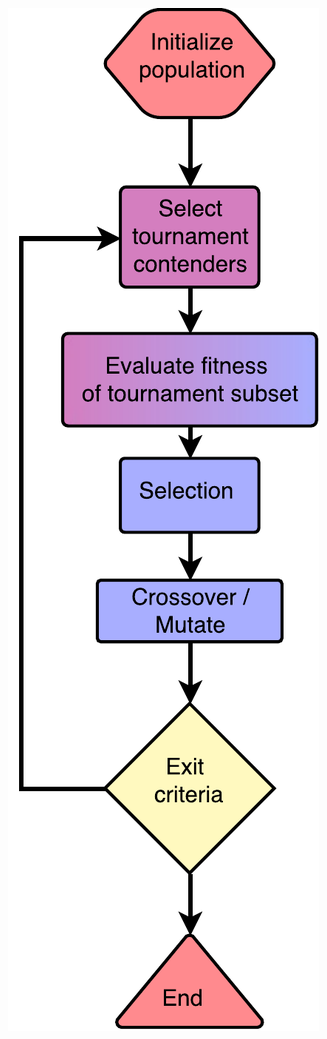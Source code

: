 \begin{figure}[h]
\begin{subfigure}[h]{0.25\linewidth}
    \end{subfigure}
    \hspace{0.25\textwidth}
    \begin{subfigure}[h]{0.25\linewidth}
        \includegraphics[width=\linewidth]{Chapters/2.Background/figures/tournamentsearch_flowchart.pdf}

\end{subfigure}
\end{figure}
